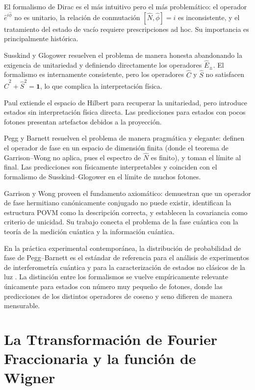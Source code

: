         El formalismo de Dirac es el más intuitivo pero el más problemático: el operador $\hat{e}^{i\hat{\phi}}$ no es unitario, la relación de conmutación $[\hat{N}, \hat{\phi}] = i$ es inconsistente, y el tratamiento del estado de vacío requiere prescripciones ad hoc. Su importancia es principalmente histórica.
        
        Susskind y Glogower resuelven el problema de manera honesta abandonando la exigencia de unitariedad y definiendo directamente los operadores $\hat{E}_{\pm}$. El formalismo es internamente consistente, pero los operadores $\hat{C}$ y $\hat{S}$ no satisfacen $\hat{C}^2 + \hat{S}^2 = \mathbf{1}$, lo que complica la interpretación física.
        
        Paul extiende el espacio de Hilbert para recuperar la unitariedad, pero introduce estados sin interpretación física directa. Las predicciones para estados con pocos fotones presentan artefactos debidos a la proyección.
        
        Pegg y Barnett resuelven el problema de manera pragmática y elegante: definen el operador de fase en un espacio de dimensión finita (donde el teorema de Garrison--Wong no aplica, pues el espectro de $\hat{N}$ es finito), y toman el límite al final. Las predicciones son físicamente interpretables y coinciden con el formalismo de Susskind--Glogower en el límite de muchos fotones.
        
        Garrison y Wong proveen el fundamento axiomático: demuestran que un operador de fase hermitiano canónicamente conjugado no puede existir, identifican la estructura POVM como la descripción correcta, y establecen la covariancia como criterio de unicidad. Su trabajo conecta el problema de la fase cuántica con la teoría de la medición cuántica y la información cuántica.
        
        En la práctica experimental contemporánea, la distribución de probabilidad de fase de Pegg--Barnett es el estándar de referencia para el análisis de experimentos de interferometría cuántica y para la caracterización de estados no clásicos de la luz \cite{Barnett1989,Lynch1995}. La distinción entre los formalismos se vuelve empíricamente relevante únicamente para estados con número muy pequeño de fotones, donde las predicciones de los distintos operadores de coseno y seno difieren de manera mensurable.

    \section{La Ttransformación de Fourier Fraccionaria y la función de Wigner}
            
